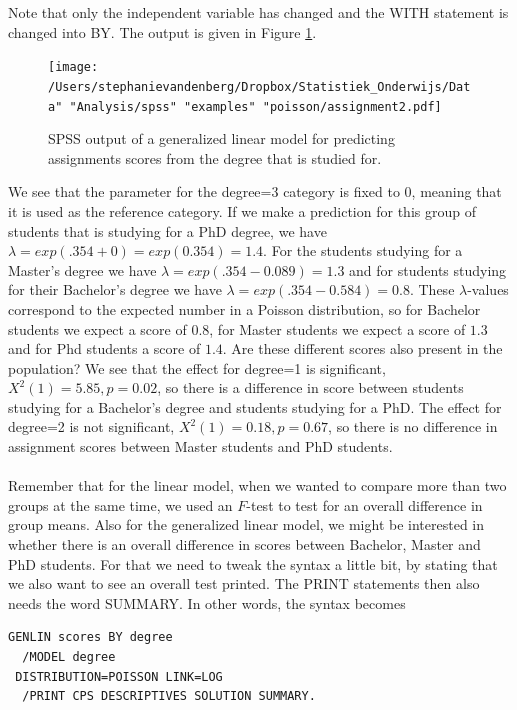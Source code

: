 \documentclass[]{book}\usepackage[]{graphicx}\usepackage[]{color}
\begin{document}
Note that only the independent variable has changed and the WITH statement is changed into BY. The output is given in Figure \ref{fig:assignment2}.



\begin{figure}[h]
    \begin{center}
       \texttt{[image: /Users/stephanievandenberg/Dropbox/Statistiek\_Onderwijs/Data" "Analysis/spss" "examples" "poisson/assignment2.pdf]}
    \end{center}
     \caption{SPSS output of a generalized linear model for predicting assignments scores from the degree that is studied for.}
    \label{fig:assignment2}
\end{figure}


We see that the parameter for the degree=3 category is fixed to 0, meaning that it is used as the reference category. If we make a prediction for this group of students that is studying for a PhD degree, we have $\lambda = exp(.354 + 0) = exp(0.354)=1.4$. For the students studying for a Master's degree we have $\lambda = exp(.354 - 0.089) =1.3$ and for students studying for their Bachelor's degree we have $\lambda = exp(.354 - 0.584) =0.8$. These $\lambda$-values correspond to the expected number in a Poisson distribution, so for Bachelor students we expect a score of $0.8$, for Master students we expect a score of $1.3$ and for Phd students a score of $1.4$. Are these different scores also present in the population? We see that the effect for degree=1 is significant, $X^2(1)=5.85, p=0.02$, so there is a difference in score between students studying for a Bachelor's degree and students studying for a PhD. The effect for degree=2 is not significant, $X^2(1)=0.18, p=0.67$, so there is no difference in assignment scores between Master students and PhD students.
\\
\\
Remember that for the linear model, when we wanted to compare more than two groups at the same time, we used an $F$-test to test for an overall difference in group means. Also for the generalized linear model, we might be interested in whether there is an overall difference in scores between Bachelor, Master and PhD students. For that we need to tweak the syntax a little bit, by stating that we also want to see an overall test printed. The PRINT statements then also needs the word SUMMARY. In other words, the syntax becomes

\begin{verbatim}
GENLIN scores BY degree
  /MODEL degree
 DISTRIBUTION=POISSON LINK=LOG
  /PRINT CPS DESCRIPTIVES SOLUTION SUMMARY.
\end{verbatim}
\end{document}
